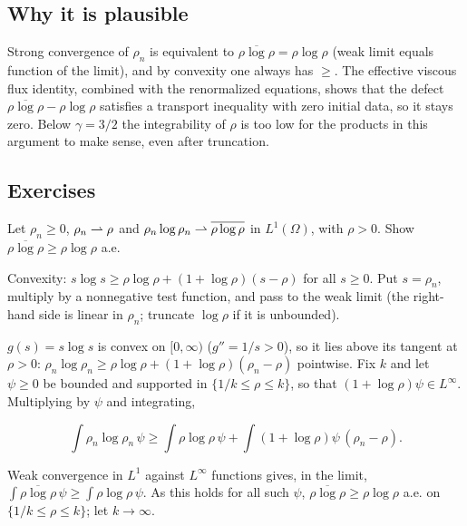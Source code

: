 \subsection*{Why it is plausible}

Strong convergence of $\rho_n$ is equivalent to $\overline{\rho\log\rho}=\rho\log\rho$ (weak limit equals function of the limit), and by convexity one always has $\ge$. The effective viscous flux identity, combined with the renormalized equations, shows that the defect $\overline{\rho\log\rho}-\rho\log\rho$ satisfies a transport inequality with zero initial data, so it stays zero. Below $\gamma=3/2$ the integrability of $\rho$ is too low for the products in this argument to make sense, even after truncation.

\subsection*{Exercises}

\begin{exercise}
  Let $\rho_n \ge 0$, $\rho_n \rightharpoonup \rho$ and $\rho_n\log\rho_n \rightharpoonup \overline{\rho\log\rho}$ in $L^1(\Omega)$, with $\rho > 0$. Show $\overline{\rho\log\rho} \ge \rho\log\rho$ a.e.
  \begin{hint}
    Convexity: $s\log s \ge \rho\log\rho + (1 + \log\rho)(s - \rho)$ for all $s \ge 0$. Put $s = \rho_n$, multiply by a nonnegative test function, and pass to the weak limit (the right-hand side is linear in $\rho_n$; truncate $\log\rho$ if it is unbounded).
  \end{hint}
  \begin{solution}
    $g(s) = s\log s$ is convex on $[0,\infty)$ ($g'' = 1/s > 0$), so it lies above its tangent at $\rho > 0$: $\rho_n\log\rho_n \ge \rho\log\rho + (1 + \log\rho)(\rho_n - \rho)$ pointwise. Fix $k$ and let $\psi \ge 0$ be bounded and supported in $\{1/k \le \rho \le k\}$, so that $(1 + \log\rho)\psi \in L^\infty$. Multiplying by $\psi$ and integrating,

    \[ \int\rho_n\log\rho_n\,\psi \ge \int\rho\log\rho\,\psi + \int(1 + \log\rho)\psi\,(\rho_n - \rho). \]

    Weak convergence in $L^1$ against $L^\infty$ functions gives, in the limit, $\int\overline{\rho\log\rho}\,\psi \ge \int\rho\log\rho\,\psi$. As this holds for all such $\psi$, $\overline{\rho\log\rho} \ge \rho\log\rho$ a.e. on $\{1/k \le \rho \le k\}$; let $k \to \infty$.
  \end{solution}
\end{exercise}

